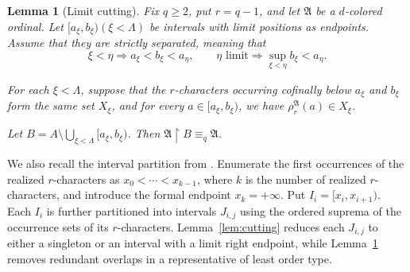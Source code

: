 \documentclass{amsart}
\newtheorem{lemma}{Lemma}
\theoremstyle{definition}
\begin{document}
\begin{lemma}[Limit cutting]\label{lem:limit-cutting}
    Fix $q\geq2$, put $r = q-1$, and let $\mathfrak A$ be a $d$-colored ordinal. Let $[a_\xi,b_\xi)(\xi<\Lambda)$ be intervals with limit positions as endpoints. Assume that they are strictly separated, meaning that
    $$ \xi<\eta\Longrightarrow a_\xi<b_\xi<a_\eta,\qquad\eta\text{ limit}\Longrightarrow\sup_{\xi<\eta}b_\xi<a_\eta.$$
    
    For each $\xi<\Lambda$, suppose that the $r$-characters occurring cofinally below $a_\xi$ and $b_\xi$ form the same set $X_\xi$, and for every $a\in[a_\xi,b_\xi)$, we have $\rho_r^{\mathfrak A}(a)\in X_\xi$.
    
    Let $B=A\setminus\bigcup_{\xi<\Lambda}[a_\xi,b_\xi)$. Then $\mathfrak A\mathbin{\upharpoonright}B\equiv_q\mathfrak A$.
\end{lemma}

We also recall the interval partition from \cite[Theorem~3.4]{Mwesigye2018}. Enumerate the first occurrences of the realized $r$-characters as $x_0<\cdots<x_{k-1}$, where $k$ is the number of realized $r$-characters, and introduce the formal endpoint $x_k=+\infty$. Put $I_i=[x_i,x_{i+1})$. Each $I_i$ is further partitioned into intervals $J_{i,j}$ using the ordered suprema of the occurrence sets of its $r$-characters. Lemma~\ref{lem:cutting} reduces each $J_{i,j}$ to either a singleton or an interval with a limit right endpoint, while Lemma~\ref{lem:limit-cutting} removes redundant overlaps in a representative of least order type.
\end{document}
